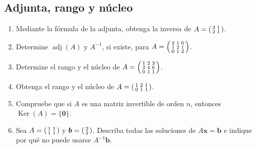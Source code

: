 \documentclass[12pt]{article}
\theoremstyle{remark}
\newcommand{\adj}{\operatorname{adj}}
\newcommand{\Ker}{\operatorname{Ker}}
\newcommand{\vect}[1]{\boldsymbol{#1}}
\newcounter{contadorEjercicio}
\newenvironment{listaejercicios}{\begin{enumerate}[label=\textbf{E\arabic*.},leftmargin=2.4em,itemsep=0.52em]\setcounter{enumi}{\value{contadorEjercicio}}}{\setcounter{contadorEjercicio}{\value{enumi}}\end{enumerate}}
\begin{document}
\subsection{Adjunta, rango y núcleo}
\begin{listaejercicios}
\item Mediante la fórmula de la adjunta, obtenga la inversa de $A=\begin{psmallmatrix}3&1\\2&1\end{psmallmatrix}$.
\item Determine $\adj(A)$ y $A^{-1}$, si existe, para $A=\begin{psmallmatrix}2&1&0\\1&2&1\\0&1&2\end{psmallmatrix}$.
\item Determine el rango y el núcleo de $A=\begin{psmallmatrix}1&2&3\\2&4&6\\0&1&1\end{psmallmatrix}$.
\item Obtenga el rango y el núcleo de $A=\begin{psmallmatrix}1&2&1\\0&1&1\end{psmallmatrix}$.
\item Compruebe que si $A$ es una matriz invertible de orden $n$, entonces $\Ker(A)=\{\vect0\}$.
\item Sea $A=\begin{psmallmatrix}1&1\\1&1\end{psmallmatrix}$ y $\vect b=\begin{psmallmatrix}2\\2\end{psmallmatrix}$. Describa todas las soluciones de $A\vect{x}=\vect b$ e indique por qué no puede usarse $A^{-1}\vect b$.
\end{listaejercicios}
\end{document}
